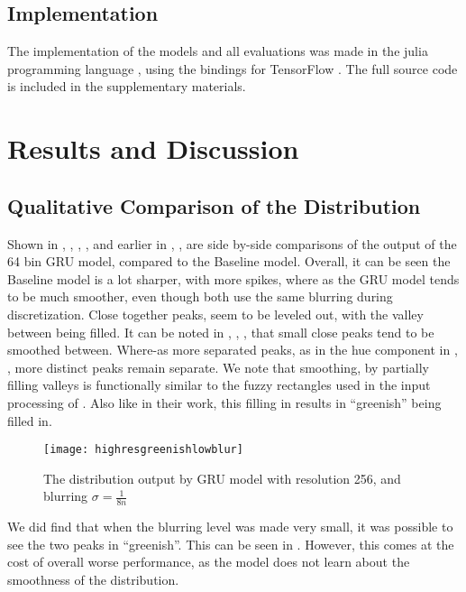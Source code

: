\documentclass[11pt,letterpaper]{article}
\newcommand{\parencite}{\cite}
\newcommand{\textcite}{\newcite}
\begin{document}
\subsection{Implementation}
The implementation of the models and all evaluations was made in the julia programming language \parencite{Julia},
using the bindings for TensorFlow \parencite{tensorflow2015-whitepaper}.
The full source code is included in the supplementary materials.

\section{Results and Discussion}
\subsection{Qualitative Comparison of the Distribution}\label{resultsdistributions}




Shown in , , , , and earlier in , ,  are side by-side comparisons of the output of the 64 bin GRU model, compared to the Baseline model.
Overall, it can be seen the Baseline model is a lot sharper, with more spikes,
where as the GRU model tends to be much smoother, even though both use the same blurring during discretization.
Close together peaks, seem to be leveled out, with the valley between being filled.
It can be noted in , , , that small close peaks tend to be smoothed between.
Where-as more separated peaks, as in the hue component in , ,  more distinct peaks remain separate.
We note that smoothing, by partially filling valleys is functionally similar to the fuzzy rectangles used in the input processing of \textcite{mcmahan2015bayesian}.
Also like in their work, this filling in results in ``greenish'' being filled in.



\begin{figure}
	
	\texttt{[image: highresgreenishlowblur]}
	\caption{\label{fighighresgreenishlowblur} The distribution output by GRU model with resolution 256, and blurring $\sigma=\frac{1}{8n}$}
\end{figure}
We did find that when the blurring level was made very small, it was possible to see the two peaks in ``greenish''.
This can be seen in .
However, this comes at the cost of overall worse performance, as the model does not learn about the smoothness of the distribution.
\end{document}
